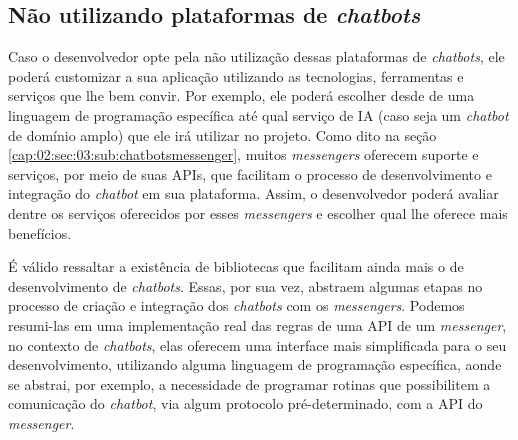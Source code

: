 \subsection{Não utilizando plataformas de \textit{chatbots}}\label{chatbot:dev:nplat}

Caso o desenvolvedor opte pela não utilização dessas plataformas de \textit{chatbots}, ele poderá customizar a sua aplicação utilizando as tecnologias, ferramentas e serviços que lhe bem convir.
Por exemplo, ele poderá escolher desde de uma linguagem de programação específica até qual serviço de IA (caso seja um \textit{chatbot} de domínio amplo) que ele irá utilizar no projeto.
Como dito na seção \ref{cap:02:sec:03:sub:chatbotsmessenger}, muitos \textit{messengers} oferecem suporte e serviços, por meio de suas APIs, que facilitam o processo de desenvolvimento e integração do \textit{chatbot} em sua plataforma.
Assim, o desenvolvedor poderá avaliar dentre os serviços oferecidos por esses \textit{messengers} e escolher qual lhe oferece mais benefícios.

É válido ressaltar a existência de bibliotecas que facilitam ainda mais o de desenvolvimento de \textit{chatbots}.
Essas, por sua vez, abstraem algumas etapas no processo de criação e integração dos \textit{chatbots} com os \textit{messengers}.
Podemos resumi-las em uma implementação real das regras de uma API de um \textit{messenger}, no contexto de \textit{chatbots}, elas oferecem uma interface mais simplificada para o seu desenvolvimento, utilizando alguma linguagem de programação específica, aonde se abstrai, por exemplo, a necessidade de programar rotinas que possibilitem a comunicação do \textit{chatbot}, via algum protocolo pré-determinado, com a API do \textit{messenger}.
